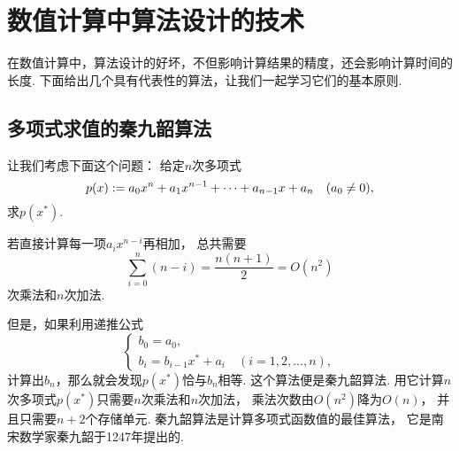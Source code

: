 \section{数值计算中算法设计的技术}
在数值计算中，算法设计的好坏，不但影响计算结果的精度，还会影响计算时间的长度.
下面给出几个具有代表性的算法，让我们一起学习它们的基本原则.

\subsection{多项式求值的秦九韶算法}
让我们考虑下面这个问题：
给定\(n\)次多项式\begin{equation}\label{equation:数值计算算法设计.秦九韶算法待计算的多项式}
	p(x)
	:=
	a_0 x^n + a_1 x^{n-1} + \dotsb + a_{n-1} x + a_n
	\quad(a_0\neq0),
\end{equation}
求\(p(x^*)\).

若直接计算每一项\(a_i x^{n-i}\)再相加，
总共需要\begin{equation*}
	\sum_{i=0}^n (n-i)
	= \frac{n(n+1)}{2}
	= O(n^2)
\end{equation*}
次乘法和\(n\)次加法.

但是，如果利用递推公式\begin{equation}\label{equation:数值计算算法设计.秦九韶算法递推公式1}
	\begin{cases}
		b_0 = a_0, \\
		b_i = b_{i-1} x^* + a_i
		\quad(i=1,2,\dotsc,n),
	\end{cases}
\end{equation}
计算出\(b_n\)，那么就会发现\(p(x^*)\)恰与\(b_n\)相等.
这个算法便是秦九韶算法.
用它计算\(n\)次多项式\(p(x^*)\)只需要\(n\)次乘法和\(n\)次加法，
乘法次数由\(O(n^2)\)降为\(O(n)\)，
并且只需要\(n+2\)个存储单元.
秦九韶算法是计算多项式函数值的最佳算法，
它是南宋数学家秦九韶于1247年提出的.

